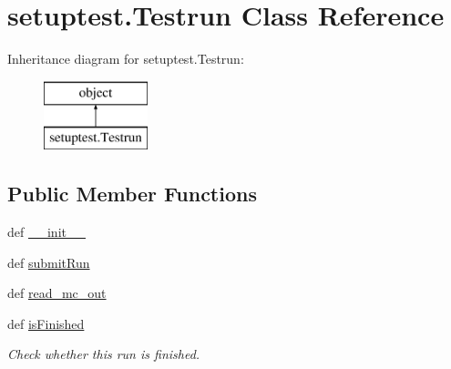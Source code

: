 \hypertarget{classsetuptest_1_1_testrun}{\section{setuptest.\-Testrun Class Reference}
\label{classsetuptest_1_1_testrun}
}
Inheritance diagram for setuptest.\-Testrun\-:\begin{figure}[H]
\begin{center}
\leavevmode
\includegraphics[height=2.000000cm]{classsetuptest_1_1_testrun}
\end{center}
\end{figure}
\subsection*{Public Member Functions}
\begin{DoxyCompactItemize}
\item 
def \hyperlink{classsetuptest_1_1_testrun_ababce1d63182e8b77fe6b6bf393cb656}{\-\_\-\-\_\-init\-\_\-\-\_\-}
\item 
def \hyperlink{classsetuptest_1_1_testrun_a0748a698b86bc66fc296b3708c5f856c}{submit\-Run}
\item 
def \hyperlink{classsetuptest_1_1_testrun_a4f355a4e1ca30600e384ef21e9b4f19a}{read\-\_\-mc\-\_\-out}
\item 
def \hyperlink{classsetuptest_1_1_testrun_a63f11436b0d8dc23cbcce8a216b0e8e1}{is\-Finished}
\begin{DoxyCompactList}\small\item\em Check whether this run is finished. \end{DoxyCompactList}\end{DoxyCompactItemize}
